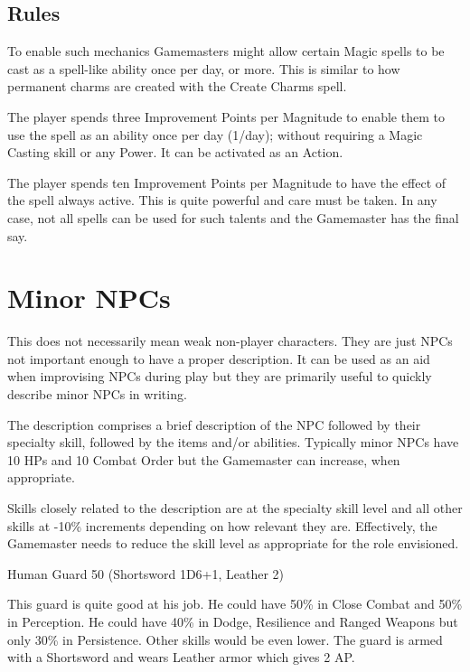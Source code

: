 \subsection{Rules}
To enable such mechanics Gamemasters might allow certain Magic spells to be cast as a spell-like ability once per day, or more. This is similar to how permanent charms are created with the Create Charms spell.

The player spends three Improvement Points per Magnitude to enable them to use the spell as an ability once per day (1/day); without requiring a Magic Casting skill or any Power. It can be activated as an Action. 

The player spends ten Improvement Points per Magnitude to have the effect of the spell always active. This is quite powerful and care must be taken. In any case, not all spells can be used for such talents and the Gamemaster has the final say.


\section{Minor NPCs}
This does not necessarily mean weak non-player characters. They are just NPCs not important enough to have a proper description. It can be used as an aid when improvising NPCs during play but they are primarily useful to quickly describe minor NPCs in writing.

The description comprises a brief description of the NPC followed by their specialty skill, followed by the items and/or abilities. Typically minor NPCs have 10 HPs and 10 Combat Order but the Gamemaster can increase, when appropriate.

Skills closely related to the description are at the specialty skill level and all other skills at -10\% increments depending on how relevant they are. Effectively, the Gamemaster needs to reduce the skill level as appropriate for the role envisioned.

\vspace{2em}
\begin{rpg-examplebox}	
Human Guard 50 (Shortsword 1D6+1, Leather 2)
\end{rpg-examplebox}
\vspace{1em}

This guard is quite good at his job. He could have 50\% in Close Combat and 50\% in Perception. He could have 40\% in Dodge, Resilience and Ranged Weapons but only 30\% in Persistence. Other skills would be even lower.
The guard is armed with a Shortsword and wears Leather armor which gives 2 AP.

